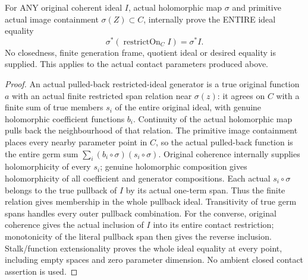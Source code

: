 \begin{lemma}
\label{hir:submersion-contact-param-coeff-whole-restriction}
\leanok
For ANY original coherent ideal $I$, actual holomorphic map $\sigma$ and
primitive actual image containment $\sigma(Z)\subset C$, internally prove the
ENTIRE ideal equality
\[\sigma^*(\operatorname{restrictOn}_C I)=\sigma^*I.\]
No closedness, finite generation frame, quotient ideal or desired equality is
supplied. This applies to the actual contact parameters produced above.
\end{lemma}
\begin{proof}
An actual pulled-back restricted-ideal generator is a true original function
$a$ with an actual finite restricted span relation near $\sigma(z)$: it agrees
on $C$ with a finite sum of true members $s_i$ of the entire original ideal,
with genuine holomorphic coefficient functions $b_i$. Continuity of the
actual holomorphic map pulls back the neighbourhood of that relation. The
primitive image containment places every nearby parameter point in $C$, so
the actual pulled-back function is the entire germ sum
$\sum_i(b_i\circ\sigma)(s_i\circ\sigma)$. Original coherence internally
supplies holomorphicity of every $s_i$; genuine holomorphic composition gives
holomorphicity of all coefficient and generator compositions. Each actual
$s_i\circ\sigma$ belongs to the true pullback of $I$ by its actual one-term
span. Thus the finite relation gives membership in the whole pullback ideal.
Transitivity of true germ spans handles every outer pullback combination.
For the converse, original coherence gives the actual inclusion of $I$ into
its entire contact restriction; monotonicity of the literal pullback span
then gives the reverse inclusion. Stalk/function extensionality proves the
whole ideal equality at every point, including empty spaces and zero
parameter dimension. No ambient closed contact assertion is used.
\end{proof}

